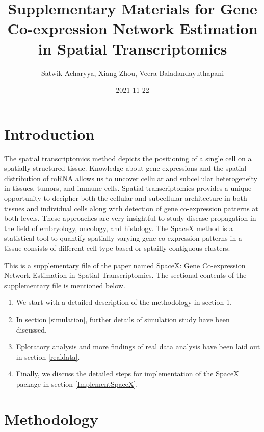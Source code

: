 \documentclass[
]{book}
\title{Supplementary Materials for Gene Co-expression Network Estimation in Spatial Transcriptomics}
\author{Satwik Acharyya, Xiang Zhou, Veera Baladandayuthapani}
\date{2021-11-22}
\providecommand{\tightlist}{%
  \setlength{\itemsep}{0pt}\setlength{\parskip}{0pt}}
\begin{document}
\maketitle

{
\setcounter{tocdepth}{1}
\tableofcontents
}
\hypertarget{appendix-supplementary-materials}{%
\appendix}


\hypertarget{introduction}{%
\chapter*{Introduction}\label{introduction}}

The spatial transcriptomics method depicts the positioning of a single cell on a spatially structured tissue. Knowledge about gene expressions and the spatial distribution of mRNA allows us to uncover cellular and subcellular heterogeneity in tissues, tumors, and immune cells. Spatial transcriptomics provides a unique opportunity to decipher both the cellular and subcellular architecture in both tissues and individual cells along with detection of gene co-expression patterns at both levels. These approaches are very insightful to study disease propagation in the field of embryology, oncology, and histology. The SpaceX method is a statistical tool to quantify spatially varying gene co-expression patterns in a tissue consists of different cell type based or sptailly contiguous clusters.

This is a supplementary file of the paper named SpaceX: Gene Co-expression Network Estimation in Spatial Transcriptomics. The sectional contents of the supplementary file is mentioned below.

\begin{enumerate}
\def\labelenumi{\arabic{enumi}.}
\tightlist
\item
  We start with a detailed description of the methodology in section \ref{method}.
\item
  In section \ref{simulation}, further details of simulation study have been discussed.
\item
  Eploratory analysis and more findings of real data analysis have been laid out in section \ref{realdata}.
\item
  Finally, we discuss the detailed steps for implementation of the SpaceX package in section \ref{ImplementSpaceX}.
\end{enumerate}

\hypertarget{method}{%
\chapter{Methodology}\label{method}}
\end{document}
